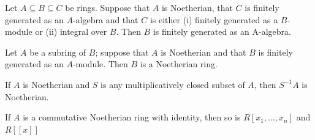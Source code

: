 \begin{proposition}
    Let $A \subseteq B \subseteq C$ be rings. Suppose that $A$ is Noetherian, that $C$ is finitely generated as an $A$-algebra and that $C$
    is either (i) finitely generated as a $B$-module or (ii) integral over $B$.
    Then $B$ is finitely generated as an A-algebra.
\end{proposition}




\begin{proposition}
    Let $A$ be a subring of $B$; suppose that $A$ is Noetherian and that $B$ is finitely generated as an $A$-module. Then $B$ is a Noetherian ring.
\end{proposition}




\begin{proposition}
    If $A$ is Noetherian and $S$ is any multiplicatively closed subset of $A$, then $S^{-1} A$ is Noetherian.
\end{proposition}



\begin{theorem}
    If $A$ is a commutative Noetherian ring with identity, then so is $R\left[x_1, \ldots, x_{n}\right]$ and $R\left[\left[x\right]\right]$
\end{theorem}

